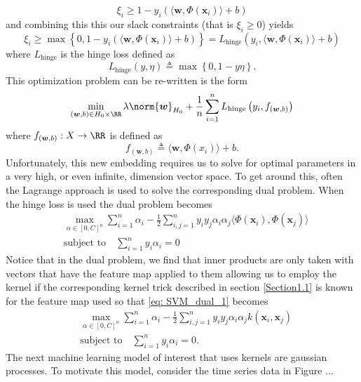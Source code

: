 \[
    \xi_i \geq 1 - y_i \left( \langle \bm{w} , \Phi \left( \bm{x}_i \right) \rangle + b \right)
\]
and combining this this our slack constraints (that is $\xi_i \geq 0$) yields
\[
    \xi_i \geq \max \left\{ 0, 1 - y_i \left( \langle \bm{w} , \Phi \left( \bm{x}_i \right) \rangle + b \right)  \right\} = L_{\text{hinge}} \left( y_i , \langle \bm{w} , \Phi \left( \bm{x}_i \right) \rangle + b \right)
\]
where $L_{\text{hinge}}$ is the hinge loss defined as
\[
    L_{\text{hinge}} \left( y,\eta \right) \triangleq \max \left\{ 0,1-y\eta \right\}.
\]
This optimization problem can be re-written is the form
\[
    \min_{\left( \bm{w} , b \right) \in H_0 \times \RR} \lambda \norm{\bm{w}}_{H_0} + \frac{1}{n} \sum_{i=1}^{n} L_{\text{hinge}} \left( y_i , f_{\left( \bm{w} , b \right)} \right)
\]
where $f_{\left( \bm{w} , b \right)} : X \to \RR$ is defined as
\[
    f_{\left( \bm{w} , b \right)} \triangleq \langle \bm{w} , \Phi \left( x_i \right) \rangle + b.
\]
Unfortunately, this new embedding requires us to solve for optimal parameters in a very high, or even infinite, dimension vector space. To get around this, often the Lagrange approach is used to solve the corresponding dual problem. When the hinge loss is used the dual problem becomes
\begin{align} \label{eq: SVM_dual_1}
     & \max_{\alpha \in \left[ 0,C \right]^n} \sum_{i=1}^{n} \alpha_i - \frac{1}{2} \sum_{i,j=1}^{n} y_i y_j \alpha_i \alpha_j \langle \Phi \left( \bm{x}_i \right), \Phi \left( \bm{x}_j \right) \rangle \nonumber \\
     & \text{subject to} \quad \sum_{i=1}^{n} y_i \alpha_i = 0
\end{align}
Notice that in the dual problem, we find that inner products are only taken with vectors that have the feature map applied to them allowing us to employ the kernel if the corresponding kernel trick described in section \ref{Section1.1} is known for the feature map used so that \ref{eq: SVM_dual_1} becomes
\begin{align*}
     & \max_{\alpha \in \left[ 0,C \right]^n} \sum_{i=1}^{n} \alpha_i - \frac{1}{2} \sum_{i,j=1}^{n} y_i y_j \alpha_i \alpha_j k \left( \bm{x}_i, \bm{x}_j \right) \\
     & \text{subject to} \quad \sum_{i=1}^{n} y_i \alpha_i = 0.
\end{align*}
The next machine learning model of interest that uses kernels are gaussian processes. To motivate this model, consider the time series data in Figure ...

